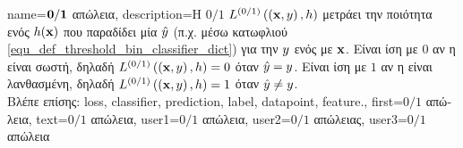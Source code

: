 {name={$\bf 0/1$ \foreignlanguage{greek}{απώλεια}},
	description={\foreignlanguage{greek}{H} $0/1$  
		$L^{(0/1)}\left(\left( {\bf x},y \right),h \right)$ \foreignlanguage{greek}{μετράει την ποιότητα ενός} 
		 $h({\bf x})$ \foreignlanguage{greek}{που παραδίδει μία} 
		 $\hat{y}$ (\foreignlanguage{greek}{π.χ. μέσω κατωφλιού} \eqref{equ_def_threshold_bin_classifier_dict}) 
		\foreignlanguage{greek}{για την}  $y$ \foreignlanguage{greek}{ενός}  
		\foreignlanguage{greek}{με}  ${\bf x}$. \foreignlanguage{greek}{Εί\-ναι ίση με $0$ αν η} 
		 \foreignlanguage{greek}{είναι σωστή, δηλαδή 
		$L^{(0/1)}\left(\left( {\bf x},y \right),h \right)=0$ όταν $\hat{y}=y$. Είναι ίση με
		$1$ αν η}  \foreignlanguage{greek}{είναι λανθασμένη, δηλαδή $L^{(0/1)}\left(\left( {\bf x},y \right),h \right)=1$ 
		όταν} $\hat{y}\neq y$.\\
		\foreignlanguage{greek}{Βλέπε επίσης:} \gls{loss}, \gls{classifier}, \gls{prediction}, \gls{label}, \gls{datapoint}, \gls{feature}.},
    	first={\foreignlanguage{greek}{$0/1$ απώλεια}},
    	text={\foreignlanguage{greek}{$0/1$ απώλεια}},
    	user1={\foreignlanguage{greek}{$0/1$ απώλεια}}, %
    	user2={\foreignlanguage{greek}{$0/1$ απώλειας}}, %
    	user3={\foreignlanguage{greek}{$0/1$ απώλεια}} %
}







